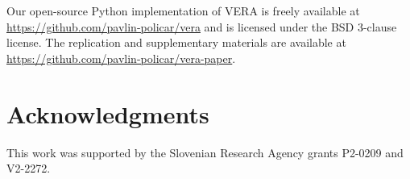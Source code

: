 \documentclass[lettersize,journal]{IEEEtran}
\begin{document}
Our open-source Python implementation of VERA is freely available at \url{https://github.com/pavlin-policar/vera} and is licensed under the BSD 3-clause license. The replication and supplementary materials are available at \url{https://github.com/pavlin-policar/vera-paper}.


\section*{Acknowledgments}
This work was supported by the Slovenian Research Agency grants P2-0209 and V2-2272.
 
%




 




\end{document}
